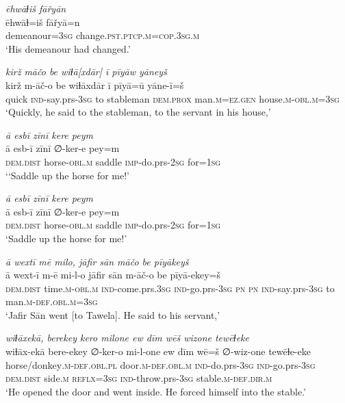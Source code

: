 \ea \label{ŠJ.49}
\textit{ēhwāɫiš fāřyān} \\ 
\gll ēhwāɫ=iš fāřyā=n \\ 
 demeanour\textsc{=3sg} change\textsc{.pst}\textsc{.ptcp}\textsc{.m}\textsc{=cop}\textsc{.3sg}\textsc{.m} \\ 
\glt `His demeanour had changed.'
\z 
 
\ea \label{ŠJ.51}
\textit{kirž māčo be wiɫā[xdār] ī pīyāw yāneyš} \\ 
\gll kirž m-āč-o be wiɫāxdār ī pīyā=ū yāne-ī=š \\ 
 quick \textsc{ind-}say.prs\textsc{-3sg} to stableman \textsc{dem.prox} man\textsc{.m}\textsc{=ez.gen} house\textsc{.m}\textsc{-obl}\textsc{.m}\textsc{=3sg} \\ 
\glt `Quickly, he said to the stableman, to the servant in his house,'
\z 
 
\ea \label{ŠJ.52}
\textit{ā esbī zīnī kere peym} \\ 
\gll ā esb-ī zīnī ∅-ker-e pey=m \\ 
 \textsc{dem.dist} horse\textsc{-obl}\textsc{.m} saddle \textsc{imp-}do.prs-\textsc{2sg} for\textsc{=\textsc{1sg}} \\ 
\glt `‘Saddle up the horse for me!'
\z 
 
\ea \label{ŠJ.53}
\textit{ā esbī zīnī kere peym} \\ 
\gll ā esb-ī zīnī ∅-ker-e pey=m \\ 
 \textsc{dem.dist} horse\textsc{-obl}\textsc{.m} saddle \textsc{imp-}do.prs-\textsc{2sg} for\textsc{=\textsc{1sg}} \\ 
\glt `Saddle up the horse for me!'
\z 
 
\ea \label{ŠJ.59}
\textit{ā wextī mē milo, jāfir sān māčo be pīyākeyš} \\ 
\gll ā wext-ī m-ē mi-l-o jāfir sān m-āč-o be pīyā-ekey=š \\ 
 \textsc{dem.dist} time\textsc{.m}\textsc{-obl}\textsc{.m} \textsc{ind-}come.prs\textsc{.3sg} \textsc{ind-}go.prs\textsc{-3sg} \textsc{pn} \textsc{pn} \textsc{ind-}say.prs\textsc{-3sg} to man\textsc{.m}\textsc{-def}\textsc{.obl}\textsc{.m}\textsc{=3sg} \\ 
\glt `Jafir Sān went [to Tawela]. He said to his servant,'
\z 
 
\ea \label{ŠJ.64}
\textit{wiɫāxekā, berekey kero milone ew dīm wēš wizone tewēɫeke} \\ 
\gll wiɫāx-ekā bere-ekey ∅-ker-o mi-l-one ew dīm wē=š ∅-wiz-one tewēɫe-eke \\ 
 horse/donkey\textsc{.m}\textsc{-def}\textsc{.obl}\textsc{.pl} door\textsc{.m}\textsc{-def}\textsc{.obl}\textsc{.m} \textsc{ind-}do.prs\textsc{-3sg} \textsc{ind-}go.prs\textsc{-3sg} \textsc{dem.dist} side\textsc{.m} \textsc{reflx}\textsc{=3sg} \textsc{ind-}throw.prs\textsc{-3sg} stable\textsc{.m}\textsc{-def}\textsc{.dir}\textsc{.m} \\ 
\glt `He opened the door and went inside. He forced himself into the stable.'
\z 
 
